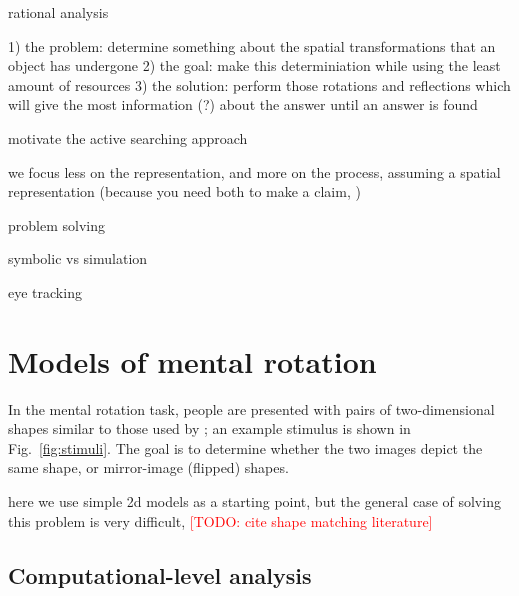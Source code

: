 \documentclass[10pt,letterpaper]{article}
\newcommand{\TODO}[1]{\textcolor{red}{[TODO: #1]}}
\begin{document}
rational analysis \cite{Marr:1983to,anderson90,Shepard:1987tt}

1) the problem: determine something about the spatial transformations
that an object has undergone
2) the goal: make this determiniation while using the least amount of
resources
3) the solution: perform those rotations and reflections which will
give the most information (?) about the answer until an answer is
found

motivate the active searching approach
\cite{Gureckis:2012gu,Markant:2012uu} \cite{Markant:2012uu,Nelson2007}

we focus less on the representation, and more on the process, assuming
a spatial representation (because you need both to make a claim,
\cite{Anderson1978})

problem solving \cite{Hegarty2004, Schwartz1999}

symbolic vs simulation \cite{Schwartz:1996uy}

eye tracking \cite{Just1976}

\section{Models of mental rotation}

In the mental rotation task, people are presented with pairs of
two-dimensional shapes similar to those used by ;
an example stimulus is shown in Fig.~\ref{fig:stimuli}. The goal is to
determine whether the two images depict the same shape, or
mirror-image (flipped) shapes.

here we use simple 2d models as a starting point, but the general case
of solving this problem is very difficult, \TODO{cite shape matching
  literature}

\subsection{Computational-level analysis}
\end{document}
